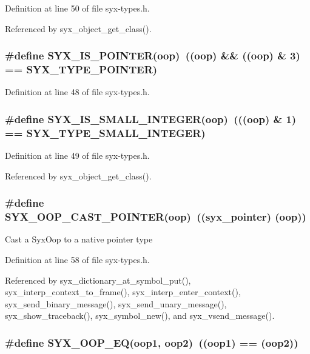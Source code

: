 Definition at line 50 of file syx-types.h.

Referenced by syx\_\-object\_\-get\_\-class().\hypertarget{syx-types_8h_c3d7742cf3e6fe2ebda18c509a0ee172}{
\subsubsection{\setlength{\rightskip}{0pt plus 5cm}\#define SYX\_\-IS\_\-POINTER(oop)~((oop) \&\& ((oop) \& 3) == SYX\_\-TYPE\_\-POINTER)}}
\label{syx-types_8h_c3d7742cf3e6fe2ebda18c509a0ee172}




Definition at line 48 of file syx-types.h.\hypertarget{syx-types_8h_521de84329f41e260c96d79b17f066a9}{
\subsubsection{\setlength{\rightskip}{0pt plus 5cm}\#define SYX\_\-IS\_\-SMALL\_\-INTEGER(oop)~(((oop) \& 1) == SYX\_\-TYPE\_\-SMALL\_\-INTEGER)}}
\label{syx-types_8h_521de84329f41e260c96d79b17f066a9}




Definition at line 49 of file syx-types.h.

Referenced by syx\_\-object\_\-get\_\-class().\hypertarget{syx-types_8h_c1fcc0de09d041e08a21ae518c09037a}{
\subsubsection{\setlength{\rightskip}{0pt plus 5cm}\#define SYX\_\-OOP\_\-CAST\_\-POINTER(oop)~(({\bf syx\_\-pointer}) (oop))}}
\label{syx-types_8h_c1fcc0de09d041e08a21ae518c09037a}


Cast a SyxOop to a native pointer type 

Definition at line 58 of file syx-types.h.

Referenced by syx\_\-dictionary\_\-at\_\-symbol\_\-put(), syx\_\-interp\_\-context\_\-to\_\-frame(), syx\_\-interp\_\-enter\_\-context(), syx\_\-send\_\-binary\_\-message(), syx\_\-send\_\-unary\_\-message(), syx\_\-show\_\-traceback(), syx\_\-symbol\_\-new(), and syx\_\-vsend\_\-message().\hypertarget{syx-types_8h_11cbe8792a6a199aa5562be393851ab5}{
\subsubsection{\setlength{\rightskip}{0pt plus 5cm}\#define SYX\_\-OOP\_\-EQ(oop1, \/  oop2)~((oop1) == (oop2))}}
\label{syx-types_8h_11cbe8792a6a199aa5562be393851ab5}




